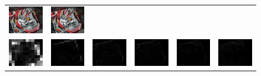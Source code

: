 \begin{landscape}
\begin{figure}
\begin{center}
\begin{tabular}{c c c c c c}
        \includegraphics[width=2.2cm]{main/chapter03/data/homography/img_src_to_dst_5.jpg} &
        \includegraphics[width=2.2cm]{main/chapter03/data/homography/img_src_to_dst_7.jpg} \\
        \includegraphics[width=2.2cm]{main/chapter03/data/homography/error_1.jpg} &
        \includegraphics[width=2.2cm]{main/chapter03/data/homography/error_2.jpg} &
        \includegraphics[width=2.2cm]{main/chapter03/data/homography/error_3.jpg} &
        \includegraphics[width=2.2cm]{main/chapter03/data/homography/error_4.jpg} &
        \includegraphics[width=2.2cm]{main/chapter03/data/homography/error_5.jpg} &
        \includegraphics[width=2.2cm]{main/chapter03/data/homography/error_7.jpg} \\

\end{tabular}
\end{center}
\end{figure}
\end{landscape}
